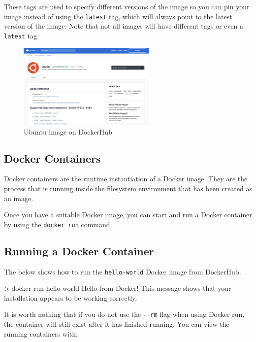 \documentclass{csse4400}
\begin{document}
These tags are used to specify different versions of the image so you can pin your image instead of using the \texttt{latest} tag,
which will always point to the latest version of the image.
Note that not all images will have different tags or even a \texttt{latest} tag.

\begin{figure}[H]
    \centering
  \includegraphics[width=0.6\textwidth]{images/dockerhub}
  \caption{Ubuntu image on DockerHub}
\end{figure}

\subsection{Docker Containers}
\label{docker-containers}

Docker containers are the runtime instantiation of a Docker image.
They are the process that is running inside the filesystem environment that has been created as an image.

Once you have a suitable Docker image,
you can start and run a Docker container by using the \texttt{docker run} command.

\subsection{Running a Docker Container}

The below shows how to run the \texttt{hello-world} Docker image from DockerHub.

\begin{code}[language=bash,numbers=none]{}
> docker run hello-world
Hello from Docker!
This message shows that your installation appears to be working correctly.
\end{code}

It is worth nothing that if you do not use the \texttt{-{}-rm} flag when using Docker run,
the container will still exist after it has finished running.
You can view the running containers with:
\end{document}
